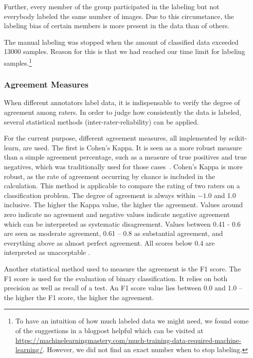 Further, every member of the group participated in the labeling but not everybody labeled the same number of images. Due to this circumstance, the labeling bias of certain members is more present in the data than of others.

The manual labeling was stopped when the amount of classified data exceeded 13000 samples. Reason for this is that we had reached our time limit for labeling samples.\footnote{To have an intuition of how much labeled data we might need, we found some of the suggestions in a blogpost helpful which can be visited at \url{https://machinelearningmastery.com/much-training-data-required-machine-learning/}. However, we did not find an exact number when to stop labeling.}


\subsubsection{Agreement Measures}
\label{subsec:AgreementMeasures}

When different annotators label data, it is indispensable to verify the degree of agreement among raters. In order to judge how consistently the data is labeled, several statistical methods (inter-rater-reliability) can be applied.

\bigskip
For the current purpose, different agreement measures, all implemented by scikit-learn, are used. The first is Cohen’s Kappa. It is seen as a more robust measure than a simple agreement percentage, such as a measure of true positives and true negatives, which was traditionally used for those cases~\citep{cohen1960coefficient}. Cohen’s Kappa is more robust, as the rate of agreement occurring by chance is included in the calculation. This method is applicable to compare the rating of two raters on a classification problem. The degree of agreement is always within $-1.0$ and 1.0 inclusive. The higher the Kappa value, the higher the agreement. Values around zero indicate no agreement and negative values indicate negative agreement which can be interpreted as systematic disagreement. Values between 0.41 - 0.6 are seen as moderate agreement, 0.61 -- 0.8 as substantial agreement, and everything above as almost perfect agreement. All scores below 0.4 are interpreted as unacceptable \citep{mchugh2012interrater}. 

Another statistical method used to measure the agreement is the F1 score. The F1 score is used for the evaluation of binary classification. It relies on both precision as well as recall of a test. An F1 score value lies between 0.0 and 1.0 -- the higher the F1 score, the higher the agreement.

